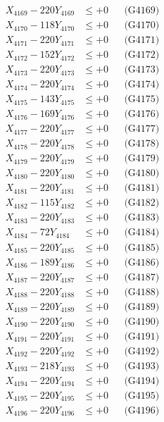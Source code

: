 \documentclass[a4paper,10pt]{article}
\begin{document}
{\begin{align}
X_{4169} - 220Y_{4169} &\leq +0 && \text{(G4169)} \\
X_{4170} - 118Y_{4170} &\leq +0 && \text{(G4170)} \\
\allowbreak
X_{4171} - 220Y_{4171} &\leq +0 && \text{(G4171)} \\
X_{4172} - 152Y_{4172} &\leq +0 && \text{(G4172)} \\
X_{4173} - 220Y_{4173} &\leq +0 && \text{(G4173)} \\
X_{4174} - 220Y_{4174} &\leq +0 && \text{(G4174)} \\
X_{4175} - 143Y_{4175} &\leq +0 && \text{(G4175)} \\
X_{4176} - 169Y_{4176} &\leq +0 && \text{(G4176)} \\
X_{4177} - 220Y_{4177} &\leq +0 && \text{(G4177)} \\
X_{4178} - 220Y_{4178} &\leq +0 && \text{(G4178)} \\
X_{4179} - 220Y_{4179} &\leq +0 && \text{(G4179)} \\
X_{4180} - 220Y_{4180} &\leq +0 && \text{(G4180)} \\
\allowbreak
X_{4181} - 220Y_{4181} &\leq +0 && \text{(G4181)} \\
X_{4182} - 115Y_{4182} &\leq +0 && \text{(G4182)} \\
X_{4183} - 220Y_{4183} &\leq +0 && \text{(G4183)} \\
X_{4184} - 72Y_{4184} &\leq +0 && \text{(G4184)} \\
X_{4185} - 220Y_{4185} &\leq +0 && \text{(G4185)} \\
X_{4186} - 189Y_{4186} &\leq +0 && \text{(G4186)} \\
X_{4187} - 220Y_{4187} &\leq +0 && \text{(G4187)} \\
X_{4188} - 220Y_{4188} &\leq +0 && \text{(G4188)} \\
X_{4189} - 220Y_{4189} &\leq +0 && \text{(G4189)} \\
X_{4190} - 220Y_{4190} &\leq +0 && \text{(G4190)} \\
\allowbreak
X_{4191} - 220Y_{4191} &\leq +0 && \text{(G4191)} \\
X_{4192} - 220Y_{4192} &\leq +0 && \text{(G4192)} \\
X_{4193} - 218Y_{4193} &\leq +0 && \text{(G4193)} \\
X_{4194} - 220Y_{4194} &\leq +0 && \text{(G4194)} \\
X_{4195} - 220Y_{4195} &\leq +0 && \text{(G4195)} \\
X_{4196} - 220Y_{4196} &\leq +0 && \text{(G4196)} \\

\end{align}}
\end{document}
